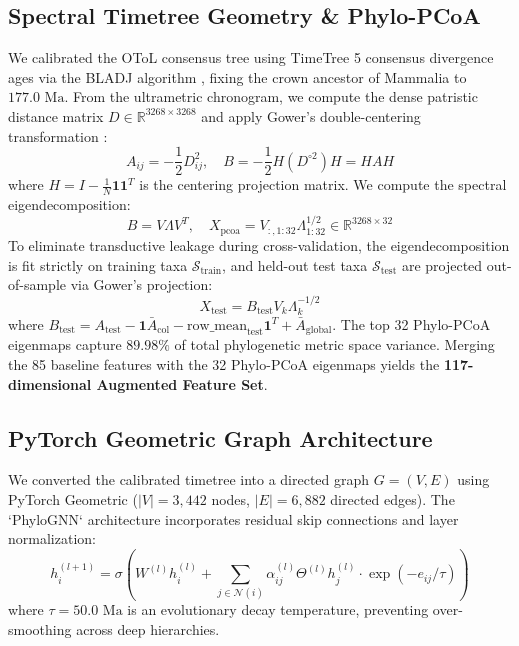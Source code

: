 \documentclass[sigconf,nonacm]{acmart}
\begin{document}
\subsection{Spectral Timetree Geometry \& Phylo-PCoA}
We calibrated the OToL consensus tree using TimeTree 5 consensus divergence ages \cite{kumar2022timetree} via the BLADJ algorithm \cite{webb2008phylocom}, fixing the crown ancestor of Mammalia to $177.0\text{ Ma}$. From the ultrametric chronogram, we compute the dense patristic distance matrix $D \in \mathbb{R}^{3268 \times 3268}$ and apply Gower's double-centering transformation \cite{gower1966some}:
\begin{equation}
A_{ij} = -\frac{1}{2} D_{ij}^2, \quad B = -\frac{1}{2} H (D^{\circ 2}) H = H A H
\end{equation}
where $H = I - \frac{1}{N}\mathbf{1}\mathbf{1}^T$ is the centering projection matrix. We compute the spectral eigendecomposition:
\begin{equation}
B = V \Lambda V^T, \quad X_{\text{pcoa}} = V_{:, 1:32} \Lambda_{1:32}^{1/2} \in \mathbb{R}^{3268 \times 32}
\end{equation}
To eliminate transductive leakage during cross-validation, the eigendecomposition is fit strictly on training taxa $\mathcal{S}_{\text{train}}$, and held-out test taxa $\mathcal{S}_{\text{test}}$ are projected out-of-sample via Gower's projection:
\begin{equation}
X_{\text{test}} = B_{\text{test}} V_k \Lambda_k^{-1/2}
\end{equation}
where $B_{\text{test}} = A_{\text{test}} - \mathbf{1} \bar{A}_{\text{col}} - \text{row\_mean}_{\text{test}} \mathbf{1}^T + \bar{A}_{\text{global}}$. The top 32 Phylo-PCoA eigenmaps capture \textbf{$89.98\%$} of total phylogenetic metric space variance. Merging the 85 baseline features with the 32 Phylo-PCoA eigenmaps yields the \textbf{117-dimensional Augmented Feature Set}.

\subsection{PyTorch Geometric Graph Architecture}
We converted the calibrated timetree into a directed graph $G = (V, E)$ using PyTorch Geometric \cite{fey2019fast} ($|V| = 3,442$ nodes, $|E| = 6,882$ directed edges). The `PhyloGNN` architecture incorporates residual skip connections and layer normalization:
\begin{equation}
h_i^{(l+1)} = \sigma \left( W^{(l)} h_i^{(l)} + \sum_{j \in \mathcal{N}(i)} \alpha_{ij}^{(l)} \Theta^{(l)} h_j^{(l)} \cdot \exp(-e_{ij} / \tau) \right)
\end{equation}
where $\tau = 50.0\text{ Ma}$ is an evolutionary decay temperature, preventing over-smoothing across deep hierarchies.
\end{document}
